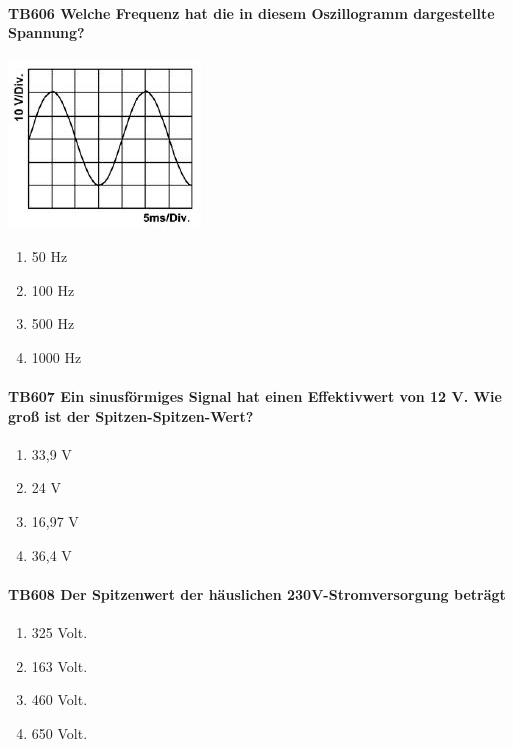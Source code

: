 \documentclass[8pt]{article}
\begin{document}
\begin{enumerate}
\paragraph*{TB606 Welche Frequenz hat die in diesem Oszillogramm dargestellte Spannung?}
\begin{center}
	\begin{minipage}{\linewidth}
		\centering
		\includegraphics[scale=0.9]{pics/tb606_a.jpg}
	\end{minipage}
\end{center}
\begin{enumerate}[nolistsep,label=\Alph*]
\item 50 Hz
\item 100 Hz
\item 500 Hz
\item 1000 Hz
\end{enumerate}



\paragraph*{TB607 Ein sinusförmiges Signal hat einen Effektivwert von 12 V. Wie groß ist der Spitzen-Spitzen-Wert?}
\begin{enumerate}[nolistsep,label=\Alph*]
\item 33,9 V
\item 24 V
\item 16,97 V
\item 36,4 V
\end{enumerate}



\paragraph*{TB608 Der Spitzenwert der häuslichen 230V-Stromversorgung beträgt}
\begin{enumerate}[nolistsep,label=\Alph*]
\item 325 Volt.
\item 163 Volt.
\item 460 Volt.
\item 650 Volt.
\end{enumerate}




\end{enumerate}
\end{document}
